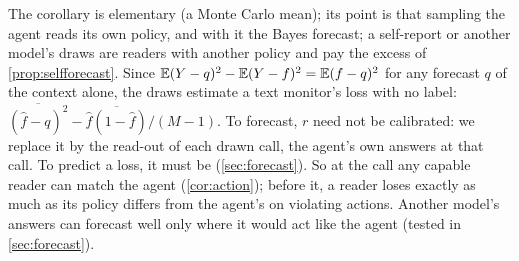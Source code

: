 The corollary is elementary (a Monte Carlo mean); its point is that sampling the agent reads its own policy, and with it the Bayes forecast; a self-report or another model's draws are readers with another policy and pay the excess of \cref{prop:selfforecast}. Since $\mathbb{E}(Y-q)^2-\mathbb{E}(Y-f)^2=\mathbb{E}(f-q)^2$ for any forecast $q$ of the context alone, the draws estimate a text monitor's loss with no label: $\overline{(\hat f-q)^2}-\overline{\hat f(1-\hat f)}/(M-1)$. To forecast, $r$ need not be calibrated: we replace it by the read-out of each drawn call, the agent's own answers at that call. To predict a loss, it must be (\cref{sec:forecast}).
So at the call any capable reader can match the agent (\cref{cor:action}); before it, a reader loses exactly as much as its policy differs from the agent's on violating actions. Another model's answers can forecast well only where it would act like the agent (tested in \cref{sec:forecast}).

